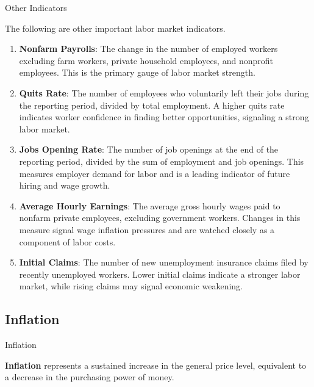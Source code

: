 \documentclass[10pt]{article}
\begin{document}
    \begin{core}{Other Indicators}

      The following are other important labor market indicators.

      \begin{enumerate}

        \item \textbf{Nonfarm Payrolls}: The change in the number of employed workers excluding farm workers, private household employees, and nonprofit employees. This is the primary gauge of labor market strength.

        \item \textbf{Quits Rate}: The number of employees who voluntarily left their jobs during the reporting period, divided by total employment. A higher quits rate indicates worker confidence in finding better opportunities, signaling a strong labor market.

        \item \textbf{Jobs Opening Rate}: The number of job openings at the end of the reporting period, divided by the sum of employment and job openings. This measures employer demand for labor and is a leading indicator of future hiring and wage growth.

        \item \textbf{Average Hourly Earnings}: The average gross hourly wages paid to nonfarm private employees, excluding government workers. Changes in this measure signal wage inflation pressures and are watched closely as a component of labor costs.

        \item \textbf{Initial Claims}: The number of new unemployment insurance claims filed by recently unemployed workers. Lower initial claims indicate a stronger labor market, while rising claims may signal economic weakening.

      \end{enumerate}

    \end{core}

  \subsection{Inflation}

    \begin{core}{Inflation}

      \textbf{Inflation} represents a sustained increase in the general price level, equivalent to a decrease in the purchasing power of money.

    \end{core}
\end{document}
